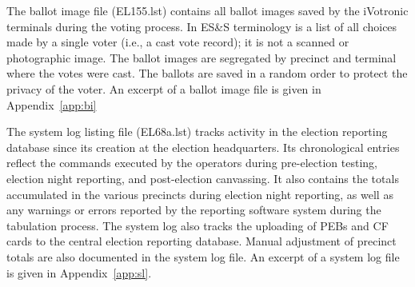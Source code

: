The ballot image file (EL155.lst) contains all ballot images saved by the iVotronic terminals during the voting process. In ES\&S terminology is a list of all choices made by a single voter (i.e., a cast vote record); it is not a scanned or photographic image. The ballot images are segregated by precinct and terminal where the votes were cast. The ballots are saved in a random order to protect the privacy of the voter.  An excerpt of a ballot image file is given in  Appendix~\ref{app:bi}
 
The system log listing file (EL68a.lst) tracks activity in the election reporting database since its creation at the election headquarters. Its chronological entries reflect the commands executed by the operators during  pre-election testing, election night reporting, and post-election canvassing. It also contains the totals accumulated in the various precincts during election night reporting, as well as any warnings or errors reported by the reporting software system during the tabulation process. The system log also tracks the uploading of PEBs and CF cards to the central election reporting database. Manual adjustment of precinct totals are also documented in the system log file. An excerpt of a system log file is given in Appendix~\ref{app:sl}.
